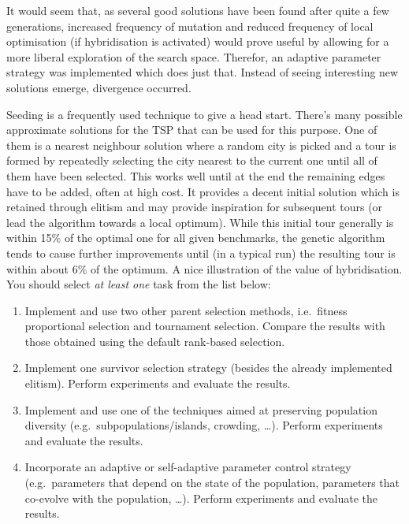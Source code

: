 
It would seem that, as several good solutions have been found after quite a few generations, increased frequency of mutation and reduced frequency of local optimisation (if hybridisation is activated) would prove useful by allowing for a more liberal exploration of the search space. Therefor, an adaptive parameter strategy was implemented which does just that. Instead of seeing interesting new solutions emerge, divergence occurred.


Seeding is a frequently used technique to give a head start. There's many possible approximate solutions for the TSP that can be used for this purpose. One of them is a nearest neighbour solution where a random city is picked and a tour is formed by repeatedly selecting the city nearest to the current one until all of them have been selected. This works well until at the end the remaining edges have to be added, often at high cost. It provides a decent initial solution which is retained through elitism and may provide inspiration for subsequent tours (or lead the algorithm towards a local optimum). While this initial tour generally is within 15\% of the optimal one for all given benchmarks, the genetic algorithm tends to cause further improvements until (in a typical run) the resulting tour is within about 6\% of the optimum. A nice illustration of the value of hybridisation. \\

You should select \emph{at least one} task from the list below:
{\small
\begin{enumerate}
\item Implement and use two other parent selection methods, i.e.\  fitness proportional selection and tournament selection. Compare the results with those obtained using the default rank-based selection. 
\item Implement one survivor selection strategy (besides the already implemented elitism). Perform experiments and evaluate the results. 
\item Implement and use one of the techniques aimed at preserving population diversity (e.g.\ subpopulations/islands, crowding, \ldots). Perform experiments and evaluate the results.
\item Incorporate an adaptive or self-adaptive parameter control strategy (e.g.\  parameters that depend on the state of the population, parameters that co-evolve with the population, \ldots). Perform experiments and evaluate the results. 
\end{enumerate}
}

